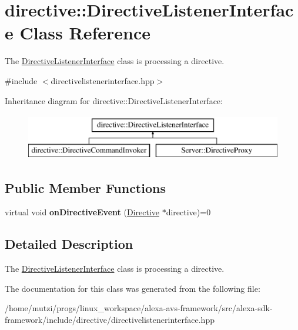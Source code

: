 \hypertarget{classdirective_1_1DirectiveListenerInterface}{}\section{directive\+:\+:Directive\+Listener\+Interface Class Reference}
\label{classdirective_1_1DirectiveListenerInterface}


The \hyperlink{classdirective_1_1DirectiveListenerInterface}{Directive\+Listener\+Interface} class is processing a directive.  




{\ttfamily \#include $<$directivelistenerinterface.\+hpp$>$}

Inheritance diagram for directive\+:\+:Directive\+Listener\+Interface\+:\begin{figure}[H]
\begin{center}
\leavevmode
\includegraphics[height=2.000000cm]{d7/d6f/classdirective_1_1DirectiveListenerInterface}
\end{center}
\end{figure}
\subsection*{Public Member Functions}
\begin{DoxyCompactItemize}
\item 
\mbox{\label{classdirective_1_1DirectiveListenerInterface_ad9ab14ddba07212ed43a1b49ff99ddc5}} 
virtual void {\bfseries on\+Directive\+Event} (\hyperlink{classdirective_1_1Directive}{Directive} $\ast$directive)=0
\end{DoxyCompactItemize}


\subsection{Detailed Description}
The \hyperlink{classdirective_1_1DirectiveListenerInterface}{Directive\+Listener\+Interface} class is processing a directive. 

The documentation for this class was generated from the following file\+:\begin{DoxyCompactItemize}
\item 
/home/mutzi/progs/linux\+\_\+workspace/alexa-\/avs-\/framework/src/alexa-\/sdk-\/framework/include/directive/directivelistenerinterface.\+hpp\end{DoxyCompactItemize}
